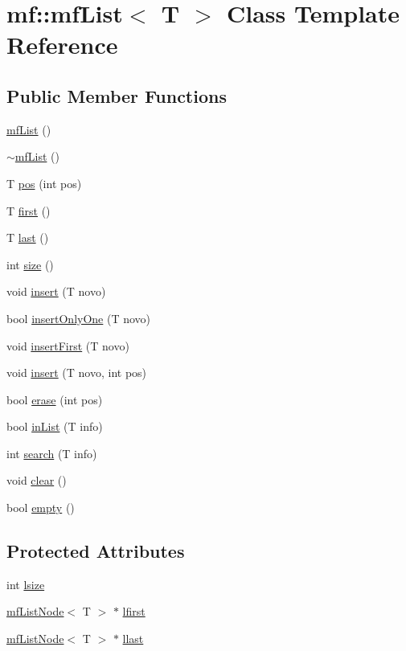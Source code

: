 \hypertarget{classmf_1_1mfList}{
\section{mf::mfList$<$ T $>$ Class Template Reference}
\label{classmf_1_1mfList}
}
\subsection*{Public Member Functions}
\begin{DoxyCompactItemize}
\item 
\hyperlink{classmf_1_1mfList_a9dd33ef36055bea004031002d4a4f026}{mfList} ()
\item 
\hyperlink{classmf_1_1mfList_ad4d3eec9f511b150164eec42459ca134}{$\sim$mfList} ()
\item 
T \hyperlink{classmf_1_1mfList_a847bb77a327152d37cedb7cc67bb0a15}{pos} (int pos)
\item 
T \hyperlink{classmf_1_1mfList_aa4aa1f0cadb360d2a30b020c0f033d6b}{first} ()
\item 
T \hyperlink{classmf_1_1mfList_a9cfc645e054d48f9b0f59e071d7b24c2}{last} ()
\item 
int \hyperlink{classmf_1_1mfList_a46420521581b1d1786feec1d220d13a0}{size} ()
\item 
void \hyperlink{classmf_1_1mfList_aa6109befcbdbfa250c92ac64f158356f}{insert} (T novo)
\item 
bool \hyperlink{classmf_1_1mfList_a06c516722437afbea46d194ee69f405c}{insertOnlyOne} (T novo)
\item 
void \hyperlink{classmf_1_1mfList_aa674ce8284228bf3840da51237b36490}{insertFirst} (T novo)
\item 
void \hyperlink{classmf_1_1mfList_a9e4631c431e66facd94f5118a057125a}{insert} (T novo, int pos)
\item 
bool \hyperlink{classmf_1_1mfList_ab8b24b126809bfdfad4dc9bff662de32}{erase} (int pos)
\item 
bool \hyperlink{classmf_1_1mfList_a99299b5d36f398ccb0becf383c7364ed}{inList} (T info)
\item 
int \hyperlink{classmf_1_1mfList_a1a43deefc120cb65083011dd6202a5d9}{search} (T info)
\item 
void \hyperlink{classmf_1_1mfList_aba45770f50fda9994f9a32aff96bc410}{clear} ()
\item 
bool \hyperlink{classmf_1_1mfList_ae12dd483320f7d90846e3f8af843244c}{empty} ()
\end{DoxyCompactItemize}
\subsection*{Protected Attributes}
\begin{DoxyCompactItemize}
\item 
int \hyperlink{classmf_1_1mfList_a05d51ad01af004b129160206f8434ff9}{lsize}
\item 
\hyperlink{classmf_1_1mfListNode}{mfListNode}$<$ T $>$ $\ast$ \hyperlink{classmf_1_1mfList_a814cc8674a44ba839f7cbbcc6a4bb172}{lfirst}
\item 
\hyperlink{classmf_1_1mfListNode}{mfListNode}$<$ T $>$ $\ast$ \hyperlink{classmf_1_1mfList_a5c24c5c4cf0d4807f181cf9ae36dd028}{llast}
\end{DoxyCompactItemize}
